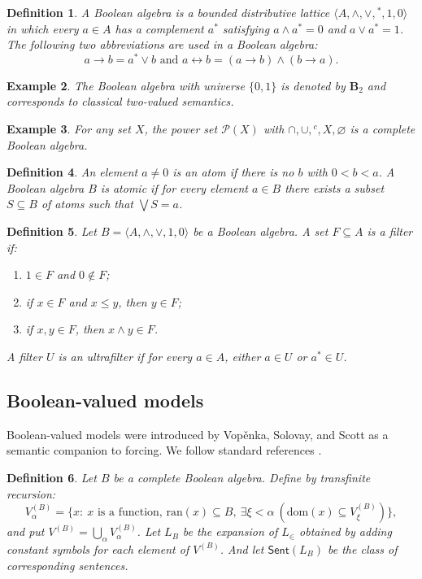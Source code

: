 \documentclass[10pt,a4paper]{amsart}
\newtheorem{definition}{Definition}[section]
\newtheorem{example}[definition]{Example}
\newcommand{\Pow}{\mathcal P}
\newcommand{\Sent}{\mathsf{Sent}}
\newcommand{\LP}{L_{\in}} %
\newcommand{\LB}{L_B}     %
\newcommand{\Btwo}{\mathbf{B}_2}
\begin{document}
\begin{definition}
A \emph{Boolean algebra} is a bounded distributive lattice
$\langle A,\wedge,\vee,{}^\ast,1,0\rangle$ in which every $a\in A$ has a complement $a^\ast$
satisfying $a\wedge a^\ast=0$ and $a\vee a^\ast=1$. The following two abbreviations are used in a Boolean algebra:
\[a \to b = a^\ast \vee b \mbox{ and } a \leftrightarrow b = (a \to b) \wedge (b \to a).\]
\end{definition}

\begin{example}
The Boolean algebra with universe $\{0,1\}$ is denoted by $\Btwo$ and corresponds to classical
two-valued semantics.
\end{example}

\begin{example}
For any set $X$, the power set $\Pow(X)$ with $\cap,\cup,{}^c,X,\varnothing$ is a complete Boolean
algebra.
\end{example}

\begin{definition}
An element $a\ne 0$ is an \emph{atom} if there is no $b$ with $0<b<a$. A Boolean algebra $B$ is \emph{atomic} if for every element $a \in B$ there exists a subset $S \subseteq B$ of atoms such that $\bigvee S = a$.
\end{definition}

\begin{definition}\label{def:filter}
Let $B=\langle A,\wedge,\vee,1,0\rangle$ be a Boolean algebra.
A set $F\subseteq A$ is a \emph{filter} if:
\begin{enumerate}[label=(\roman*)]
\item $1\in F$ and $0\notin F$;
\item if $x\in F$ and $x\le y$, then $y\in F$;
\item if $x,y\in F$, then $x\wedge y\in F$.
\end{enumerate}
A filter $U$ is an \emph{ultrafilter} if for every $a\in A$, either $a\in U$ or $a^\ast\in U$.
\end{definition}

\subsection{Boolean-valued models}

Boolean-valued models were introduced by Vop\v{e}nka, Solovay, and Scott as a semantic companion
to forcing. We follow standard references \cite{Bell,Jech}.

\begin{definition}
Let $B$ be a complete Boolean algebra. Define by transfinite recursion:
\[
V^{(B)}_\alpha=\{x:\ x \text{ is a function, }\mathrm{ran}(x)\subseteq B,\ \exists\xi<\alpha\ (\mathrm{dom}(x)\subseteq V^{(B)}_\xi)\},
\]
and put $V^{(B)}=\bigcup_\alpha V^{(B)}_\alpha$.
Let $\LB$ be the expansion of $\LP$ obtained by adding constant symbols for each element of $V^{(B)}$. And let $\Sent(L_B)$ be the class of corresponding sentences.
\end{definition}
\end{document}
